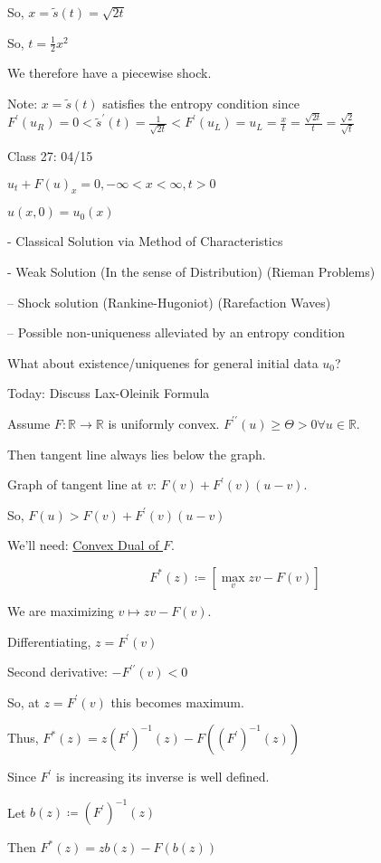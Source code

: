 \documentclass{article}
\theoremstyle{definition}
\begin{document}
So, \(x=\tilde{s}(t)=\sqrt{2t} \) 

So, \(t=\frac{1}{2}x^2\) 

We therefore have a piecewise shock.

Note: \(x = \tilde{s}(t)\) satisfies the entropy condition since \(F^{\prime} (u_R)=0 < \tilde{s}^{\prime}(t) =\frac{1}{\sqrt{2t}} < F^{\prime} (u_L)=u_L = \frac{x}{t} = \frac{\sqrt{2t}}{t} = \frac{\sqrt{2}}{\sqrt{t}} \) 

\hrulefill

Class 27: 04/15

\(u_t + F(u)_x = 0, -\infty < x < \infty , t > 0\) 

\(u(x,0)=u_0(x)\)

- Classical Solution via Method of Characteristics

- Weak Solution (In the sense of Distribution) (Rieman Problems)

-- Shock solution (Rankine-Hugoniot) (Rarefaction Waves)

-- Possible non-uniqueness alleviated by an entropy condition

What about existence/uniquenes for general initial data \(u_0\)?

Today: Discuss Lax-Oleinik Formula

Assume \(F:\mathbb{R} \to \mathbb{R}\) is uniformly convex. \(F^{\prime\prime} (u) \geq \Theta > 0 \forall u\in\mathbb{R}\).

Then tangent line always lies below the graph.

Graph of tangent line at \(v\): \(F(v)+F^{\prime} (v)(u-v)\).

So, \(F(u) > F(v) + F^{\prime} (v)(u-v)\) 

We'll need: \underline{Convex Dual of \(F\)}.

\[F^{\ast} (z) \coloneqq [\max_v zv - F(v)]\]

We are maximizing \(v \mapsto zv - F(v)\).

Differentiating, \(z = F^{\prime} (v)\)

Second derivative: \(-F^{\prime\prime}(v) < 0\)

So, at \(z = F^{\prime} (v)\) this becomes maximum.

Thus, \(F^{\ast} (z)= z (F^{\prime})^{-1} (z)-F((F^{\prime} )^{-1} (z))\) 

Since \(F^{\prime}\) is increasing its inverse is well defined.

Let \(b(z)\coloneqq (F^{\prime})^{-1} (z)\) 

Then \(F^{\ast} (z)=z b(z)-F(b(z))\) 
\end{document}
